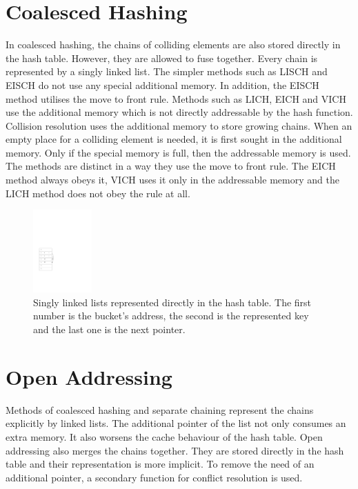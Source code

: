 \section{Coalesced Hashing}
In coalesced hashing, the chains of colliding elements are also stored directly in the hash table. However, they are allowed to fuse together. Every chain is represented by a singly linked list. The simpler methods such as LISCH and EISCH do not use any special additional memory. In addition, the EISCH method utilises the move to front rule. Methods such as LICH, EICH and VICH use the additional memory which is not directly addressable by the hash function. Collision resolution uses the additional memory to store growing chains. When an empty place for a colliding element is needed, it is first sought in the additional memory. Only if the special memory is full, then the addressable memory is used. The methods are distinct in a way they use the move to front rule. The EICH method always obeys it, VICH uses it only in the addressable memory and the LICH method does not obey the rule at all.

\begin{figure}
  \centering
    \includegraphics[width=0.2\textwidth]{images/vich}
  \caption{Singly linked lists represented directly in the hash table. The first number is the bucket's address, the second is the represented key and the last one is the next pointer.}
\end{figure}

\section{Open Addressing}
Methods of coalesced hashing and separate chaining represent the chains explicitly by linked lists. The additional pointer of the list not only consumes an extra memory. It also worsens the cache behaviour of the hash table. Open addressing also merges the chains together. They are stored directly in the hash table and their representation is more implicit. To remove the need of an additional pointer, a secondary function for conflict resolution is used.

